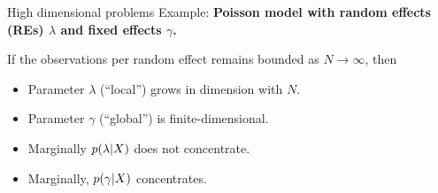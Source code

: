 \begin{frame}{High dimensional problems}
%
Example: \textbf{Poisson model with random effects (REs)
$\lambda$ and fixed effects $\gamma$.}

\pause

If the observations per random effect remains bounded as $N \rightarrow
\infty$, then
%
\begin{itemize}
%
\item Parameter $\lambda$ (``local'') grows in dimension with $N$.
\item Parameter $\gamma$ (``global'') is finite-dimensional.
\item Marginally $p(\lambda \vert X)$ does not concentrate.
\item Marginally, $p(\gamma \vert X)$ concentrates.
%
\end{itemize}

\spskip
\pause
{}

%
\end{frame}



